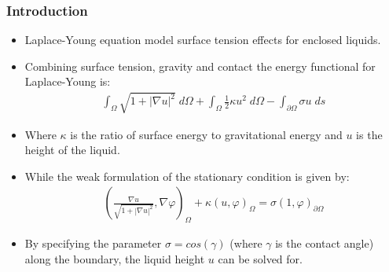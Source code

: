 \begin{frame}%
  \frametitle{Introduction}
\small
  \begin{itemize}[<+->]
    \item Laplace-Young equation model surface tension effects for enclosed liquids.
    \item Combining surface tension, gravity and contact the energy functional for Laplace-Young is:
      \begin{gather*}
        \int_\Omega \sqrt{1+|\nabla u|^2} \;d\Omega
        +
        \int_\Omega \frac 12 \kappa u^2 \;d\Omega
        -
        \int_{\partial\Omega} \sigma u \;ds
      \end{gather*}
      \item Where $\kappa$ is the ratio of surface energy to gravitational energy and $u$ is the height of the liquid.

    \item While the weak formulation of the stationary condition is given by:
      \begin{align}
        \label{eq:weak}
        \left(\frac{\nabla u}{\sqrt{1+|\nabla u|^2}},
          \nabla \varphi \right)_\Omega
        +
        \kappa\left(u,\varphi\right)_\Omega
        =
        \sigma \left(1,\varphi\right)_{\partial\Omega} 
      \end{align}

    \item By specifying the parameter $\sigma=cos(\gamma)$ (where $\gamma$ is the contact angle) along the boundary, the liquid height $u$ can be solved for.
  \end{itemize}
\end{frame}


